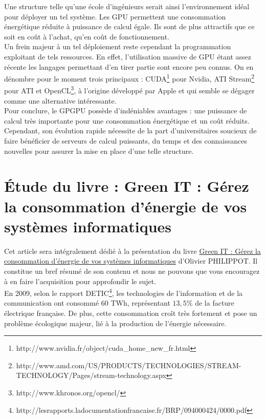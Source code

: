 \documentclass[a4paper,11pt,french]{article}
\begin{document}
Une structure telle qu’une école d’ingénieurs serait ainsi l’environnement idéal pour déployer un tel système. Les GPU permettent une consommation énergétique réduite à puissance de calcul égale. Ils sont de plus attractifs que ce soit en coût à l’achat, qu’en coût de fonctionnement.\\

Un frein majeur à un tel déploiement reste cependant la programmation exploitant de tels ressources. En effet, l'utilisation massive de GPU étant assez récente les langages permettant d'en tirer partie sont encore peu connus. On en dénombre pour le moment trois principaux : CUDA\footnote{\textsf{http://www.nvidia.fr/object/cuda\_{}home\_{}new\_{}fr.html}} pour Nvidia, ATI Stream\footnote{\textsf{http://www.amd.com/US/PRODUCTS/TECHNOLOGIES/STREAM-TECHNOLOGY/Pages/stream-technology.aspx}} pour ATI et OpenCL\footnote{\textsf{http://www.khronos.org/opencl/}}, à l'origine développé par Apple et qui semble se dégager comme une alternative intéressante.\\

Pour conclure, le GPGPU possède d'indéniables avantages : une puissance de calcul très importante pour une consommation énergétique et un coût réduits. Cependant, son évolution rapide nécessite de la part d'universitaires soucieux de faire bénéficier de serveurs de calcul puissants, du temps et des connaissances nouvelles pour assurer la mise en place d'une telle structure.\\




\section[\'Etude d'un livre]{\'Etude du livre : \og Green IT : Gérez la consommation d'énergie de vos systèmes informatiques \fg}

Cet article sera intégralement dédié à la présentation du livre \underline{Green IT : Gérez la consommation d'énergie de vos systèmes informatiques} d’Olivier PHILIPPOT. Il constitue un bref résumé de son contenu et nous ne pouvons que vous encouragez à en faire l’acquisition pour approfondir le sujet.\\

En 2009, selon le rapport DETIC\footnote{\textsf{http://lesrapports.ladocumentationfrancaise.fr/BRP/094000424/0000.pdf}}, les technologies de l’information et de la communication ont consommé 60 TWh, représentant $13,5\%$ de la facture électrique française. De plus, cette consommation croît très fortement et pose un problème écologique majeur, lié à la production de l’énergie nécessaire.\\
\end{document}
